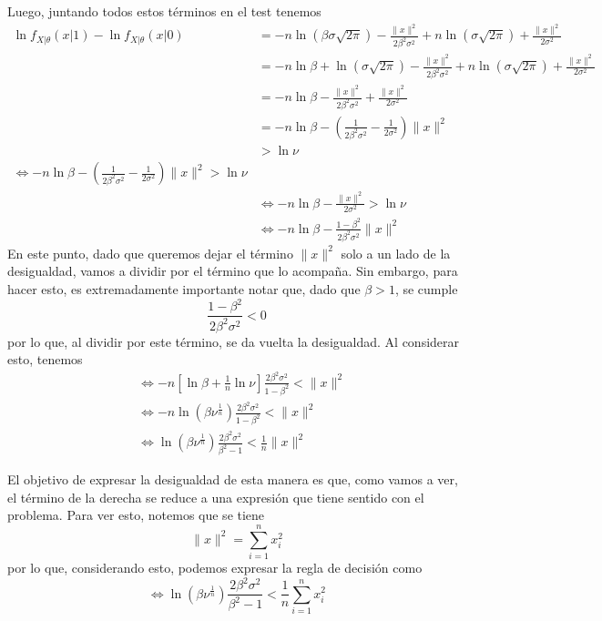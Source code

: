 \documentclass[
  11pt,
  letterpaper,
   addpoints,
   answers
  ]{exam}
\begin{document}
\begin{questions}
\begin{solution}
Luego, juntando todos estos términos en el test tenemos
\begin{align}
\ln f_{X|\theta}(x|1) - \ln f_{X|\theta}(x|0) &= -n \ln (\beta \sigma \sqrt{2\pi}) - \frac{\|x\|^2}{2 \beta^2 \sigma^2} + n \ln (\sigma \sqrt{2\pi}) + \frac{\|x\|^2}{2 \sigma^2} \\
&= -n \ln \beta + \ln (\sigma \sqrt{2\pi}) - \frac{\|x\|^2}{2 \beta^2 \sigma^2} + n \ln (\sigma \sqrt{2\pi}) + \frac{\|x\|^2}{2 \sigma^2} \\
&= -n \ln \beta - \frac{\|x\|^2}{2 \beta^2 \sigma^2} + \frac{\|x\|^2}{2 \sigma^2} \\
&= -n \ln \beta - \left( \frac{1}{2 \beta^2 \sigma^2} - \frac{1}{2 \sigma^2} \right) \|x\|^2 \\
&> \ln \nu \\
\iff -n \ln \beta - \left( \frac{1}{2 \beta^2 \sigma^2} - \frac{1}{2 \sigma^2} \right) \|x\|^2 > \ln \nu \\
&\iff -n \ln \beta - \frac{\|x\|^2}{2 \sigma^2} > \ln \nu \\
&\iff -n \ln \beta - \frac{1 - \beta^2}{2 \beta^2 \sigma^2} \|x\|^2
\end{align}
En este punto, dado que queremos dejar el término \(\|x\|^2\) solo a un lado de la desigualdad, vamos a dividir por el término que lo acompaña. Sin embargo, para hacer esto, es extremadamente importante notar que, dado que \(\beta > 1\), se cumple
\[
\frac{1 - \beta^2}{2 \beta^2 \sigma^2} < 0
\]
por lo que, al dividir por este término, se da vuelta la desigualdad. Al considerar esto, tenemos
\begin{align}
&\iff -n \left[ \ln \beta + \frac{1}{n} \ln \nu \right] \frac{2 \beta^2 \sigma^2}{1 - \beta^2} < \|x\|^2 \\
&\iff -n \ln \left( \beta \nu^{\frac{1}{n}} \right) \frac{2 \beta^2 \sigma^2}{1 - \beta^2} < \|x\|^2 \\
&\iff \ln \left( \beta \nu^{\frac{1}{n}} \right) \frac{2 \beta^2 \sigma^2}{\beta^2 - 1} < \frac{1}{n} \|x\|^2
\end{align}

El objetivo de expresar la desigualdad de esta manera es que, como vamos a ver, el término de la derecha se reduce a una expresión que tiene sentido con el problema. Para ver esto, notemos que se tiene
\[
\|x\|^2 = \sum_{i=1}^n x_i^2
\]
por lo que, considerando esto, podemos expresar la regla de decisión como
\[
\iff \ln \left( \beta \nu^{\frac{1}{n}} \right) \frac{2 \beta^2 \sigma^2}{\beta^2 - 1} < \frac{1}{n} \sum_{i=1}^n x_i^2
\]


\end{solution}
\end{questions}
\end{document}
